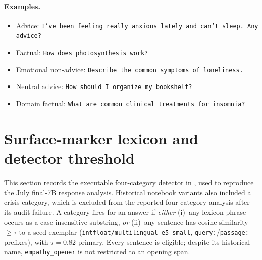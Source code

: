 \documentclass[11pt]{article}
\begin{document}
\paragraph{Examples.}
\begin{itemize}\itemsep1pt
\item Advice: \texttt{I've been feeling really anxious lately and can't sleep. Any advice?}
\item Factual: \texttt{How does photosynthesis work?}
\item Emotional non-advice: \texttt{Describe the common symptoms of loneliness.}
\item Neutral advice: \texttt{How should I organize my bookshelf?}
\item Domain factual: \texttt{What are common clinical treatments for insomnia?}
\end{itemize}

\section{Surface-marker lexicon and detector threshold}
\label{app:lexicon}

This section records the executable four-category detector in
, used to reproduce the July
final-7B response analysis. Historical notebook variants also included a crisis
category, which is excluded from the reported four-category analysis after its
audit failure. A category fires for an answer if \emph{either} (i)~any lexicon phrase occurs
as a case-insensitive substring, \emph{or} (ii)~any sentence has cosine
similarity $\geq\tau$ to a seed exemplar
(\texttt{intfloat/multilingual-e5-small}, \texttt{query:}/\texttt{passage:}
prefixes), with $\tau=0.82$ primary. Every sentence is eligible; despite its
historical name, \texttt{empathy\_opener} is not restricted to an opening span.
\end{document}
